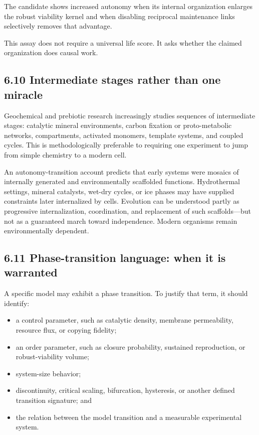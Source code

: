 \documentclass[
  11pt,
]{article}
\providecommand{\tightlist}{%
  \setlength{\itemsep}{0pt}\setlength{\parskip}{0pt}}
\begin{document}
The candidate shows increased autonomy when its internal organization
enlarges the robust viability kernel and when disabling reciprocal
maintenance links selectively removes that advantage.

This assay does not require a universal life score. It asks whether the
claimed organization does causal work.

\subsection{6.10 Intermediate stages rather than one
miracle}\label{intermediate-stages-rather-than-one-miracle}

Geochemical and prebiotic research increasingly studies sequences of
intermediate stages: catalytic mineral environments, carbon fixation or
proto-metabolic networks, compartments, activated monomers, template
systems, and coupled cycles. This is methodologically preferable to
requiring one experiment to jump from simple chemistry to a modern cell.

An autonomy-transition account predicts that early systems were mosaics
of internally generated and environmentally scaffolded functions.
Hydrothermal settings, mineral catalysts, wet-dry cycles, or ice phases
may have supplied constraints later internalized by cells. Evolution can
be understood partly as progressive internalization, coordination, and
replacement of such scaffolds---but not as a guaranteed march toward
independence. Modern organisms remain environmentally dependent.

\subsection{6.11 Phase-transition language: when it is
warranted}\label{phase-transition-language-when-it-is-warranted}

A specific model may exhibit a phase transition. To justify that term,
it should identify:

\begin{itemize}
\tightlist
\item
  a control parameter, such as catalytic density, membrane permeability,
  resource flux, or copying fidelity;
\item
  an order parameter, such as closure probability, sustained
  reproduction, or robust-viability volume;
\item
  system-size behavior;
\item
  discontinuity, critical scaling, bifurcation, hysteresis, or another
  defined transition signature; and
\item
  the relation between the model transition and a measurable
  experimental system.
\end{itemize}
\end{document}
